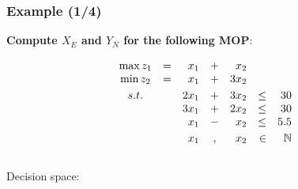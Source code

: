 \documentclass[]{beamer}
\newcommand*{\green}[1]{{\color{ngreen}#1}}
\begin{document}
\begin{frame}
  \frametitle{Example (1/4)}

\hspace{-5mm} \textbf{Compute $X_E$ and $Y_N$ for the following MOP}:

      {\scriptsize
    \[
\begin{array}{crrcrrrl}
\max z_1 & = & x_1 & + & x_2  \\
\min z_2 & = & x_1 & + & 3x_2 \vspace{1mm}\\
s.t. & & 2x_1 & + &  3x_2 & \le & 30 \\
    &&  3x_1 & + &  2x_2 & \le & 30 \\
    &&   x_1 & - &   x_2 & \le & 5.5 \vspace{1mm}\\
    &&   x_1 & , &   x_2 & \in & \mathbb{N}
\end{array}
\]



}      

\vspace{2mm}


    \begin{columns}
      \begin{column}{0.5\textwidth}
      Decision space:
      

\end{column}
\end{columns}
\end{frame}
\end{document}
